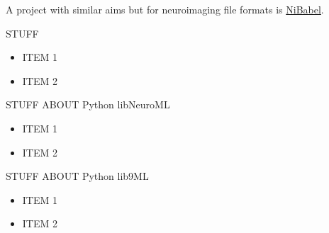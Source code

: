 \begin{multicols}{3}
A project with similar aims but for neuroimaging file formats is
\href{http://www.nipy.org/nibabel}{NiBabel}.


STUFF

\begin{itemize}[nolistsep,topsep=0em,leftmargin=1pc]
\item ITEM 1
\item ITEM 2
\end{itemize}

%


STUFF ABOUT Python libNeuroML

\begin{itemize}[nolistsep,topsep=0em,leftmargin=1pc]
\item ITEM 1
\item ITEM 2
\end{itemize}


STUFF ABOUT Python lib9ML

\begin{itemize}[nolistsep,topsep=0em,leftmargin=1pc]
\item ITEM 1
\item ITEM 2
\end{itemize}

\end{multicols}


